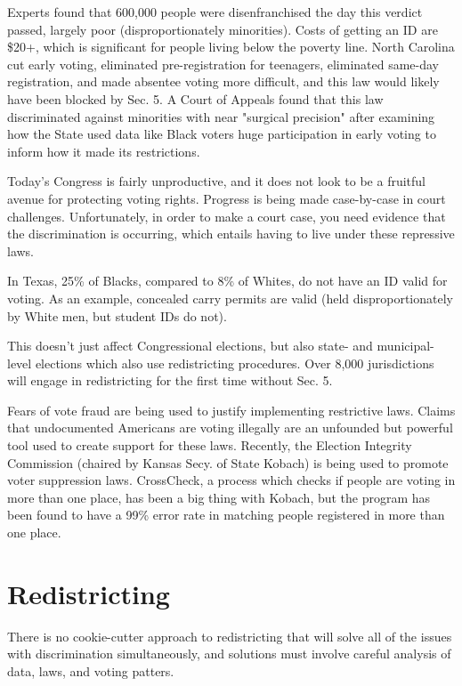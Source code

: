 Experts found that 600,000 people were disenfranchised the day this verdict passed, largely poor (disproportionately minorities).  Costs of getting an ID are \$20+, which is significant for people living below the poverty line.  North Carolina cut early voting, eliminated pre-registration for teenagers, eliminated same-day registration, and made absentee voting more difficult, and this law would likely have been blocked by Sec. 5.  A Court of Appeals found that this law discriminated against minorities with near "surgical precision" after examining how the State used data like Black voters huge participation in early voting to inform how it made its restrictions.

Today's Congress is fairly unproductive, and it does not look to be a fruitful avenue for protecting voting rights.  Progress is being made case-by-case in court challenges.  Unfortunately, in order to make a court case, you need evidence that the discrimination is occurring, which entails having to live under these repressive laws.

In Texas, 25\% of Blacks, compared to 8\% of Whites, do not have an ID valid for voting.  As an example, concealed carry permits are valid (held disproportionately by White men, but student IDs do not).

This doesn't just affect Congressional elections, but also state- and municipal-level elections which also use redistricting procedures.  Over 8,000 jurisdictions will engage in redistricting for the first time without Sec. 5.

Fears of vote fraud are being used to justify implementing restrictive laws.  Claims that undocumented Americans are voting illegally are an unfounded but powerful tool used to create support for these laws.  Recently, the Election Integrity Commission (chaired by Kansas Secy. of State Kobach) is being used to promote voter suppression laws.  CrossCheck, a process which checks if people are voting in more than one place, has been a big thing with Kobach, but the program has been found to have a 99\% error rate in matching people registered in more than one place.


\section*{Redistricting}

There is no cookie-cutter approach to redistricting that will solve all of the issues with discrimination simultaneously, and solutions must involve careful analysis of data, laws, and voting patters.

